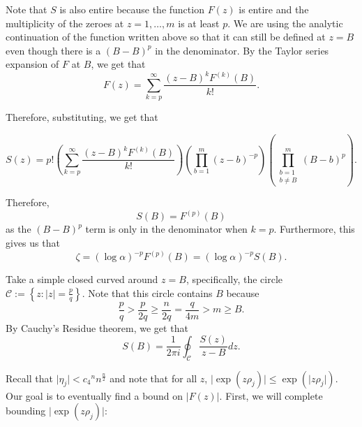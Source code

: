 \documentclass[a4paper, 11pt]{book}
\begin{document}
Note that $S$ is also entire because the function $F(z)$ is entire and the multiplicity of the zeroes at $z = 1, \ldots, m$ is at least $p$. We are using the analytic continuation of the function written above so that it can still be defined at $z = B$ even though there is a ${(B-B)}^{p}$ in the denominator. By the Taylor series expansion of $F$ at $B$, we get that 
\[F(z) = \sum\limits_{k = p}^{\infty} \frac{{(z-B)}^{k}F^{(k)}(B)}{k!}.\]

Therefore, substituting, we get that

\[S(z) = p! \left(\sum\limits_{k = p}^{\infty} \frac{{(z-B)}^{k}F^{(k)}(B)}{k!}\right) \left(\prod\limits_{b=1}^{m} {(z - b)}^{-p}\right)\left(\prod\limits_{\substack {b = 1 \\ b \neq B}}^{m} {(B - b)}^{p}\right).\]

Therefore, \[S(B) = F^{(p)}(B)\] as the ${(B-B)}^{p}$ term is only in the denominator when $k = p$. Furthermore, this gives us that \[\zeta = {(\log \alpha)}^{-p}F^{(p)}(B) = {(\log \alpha)}^{-p}S(B).\]

Take a simple closed curved around $z = B$, specifically, the circle $\mathcal{C} := \left\{z : \vert z \vert = \frac{p}{q}\right\}$. Note that this circle contains $B$ because \[\frac{p}{q} > \frac{p}{2q} \geq \frac{n}{2q} = \frac{q}{4m} > m \geq B.\] By Cauchy's Residue theorem, we get that \[S(B) = \frac{1}{2 \pi i}\oint_{\mathcal{C}} \frac{S(z)}{z-B} dz.\]

Recall that $\vert \eta_j \vert < {c_4}^{n}{n}^{\frac{n}{2}}$ and note that for all $z$, $\vert \exp(z\rho_j) \vert \leq  \exp(\vert z\rho_j \vert)$. Our goal is to eventually find a bound on $\vert F(z) \vert$. First, we will complete bounding $\vert \exp(z\rho_j) \vert$:
\end{document}
